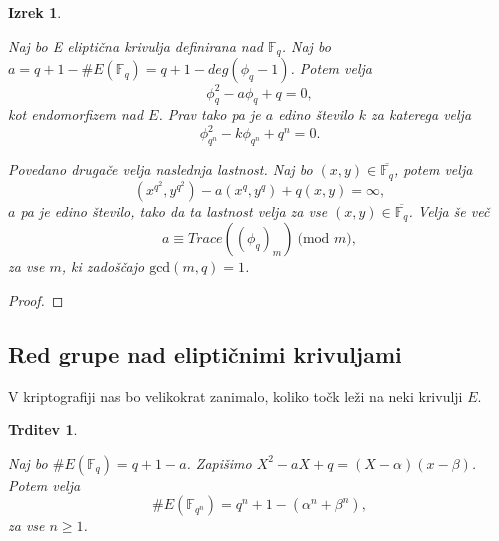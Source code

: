 \documentclass[12pt,a4paper,twoside]{article}
\theoremstyle{definition} %
\theoremstyle{plain} %
\newtheorem{izrek}[definicija]{Izrek}
\newtheorem{trditev}[definicija]{Trditev}
\numberwithin{equation}{section}  %
\newcommand{\F}{\mathbb F}
\newcommand{\E}[1]{E({#1})}
\newcommand{\MOD}[1]{\ \text{(mod }{#1}\text{)}}
\begin{document}
\begin{izrek}
\label{izrek:4.10}

Naj bo E eliptična krivulja definirana nad $\F_q$. Naj bo $a = q+1-\#\E{\F_q} = q+1-deg(\phi_q-1)$. Potem velja
$$\phi^2_q-a\phi_q+q = 0,$$
kot endomorfizem nad $E$. Prav tako pa je $a$ edino število $k$ za katerega velja
$$\phi^2_{q^n}-k\phi_{q^n}+q^n = 0.$$

Povedano drugače velja naslednja lastnost. Naj bo $(x,y) \in  \overline{\F_q}$, potem velja
$$(x^{q^2},y^{q^2})-a(x^q,y^q)+q(x,y) = \infty,$$
$a$ pa je edino število, tako da ta lastnost velja za vse $(x,y) \in \overline{\F_q} $. Velja še več
$$a \equiv Trace((\phi_q)_m) \MOD{m},$$
za vse $m$, ki zadoščajo $\text{gcd}(m,q)=1$.

\end{izrek}

\begin{proof}

\end{proof}

\subsection{Red grupe nad eliptičnimi krivuljami}


V kriptografiji nas bo velikokrat zanimalo, koliko točk leži na neki krivulji $E$.




\begin{trditev}
\label{trd:red}

Naj bo $\# \E{\F_q} = q+1-a$. Zapišimo $X^2-aX+q = (X-\alpha)(x-\beta)$. Potem velja
$$\# \E{\F_{q^{n}}} = q^n+1-(\alpha^n+\beta^n),$$
za vse $n \geq 1$.

\end{trditev}
\end{document}
